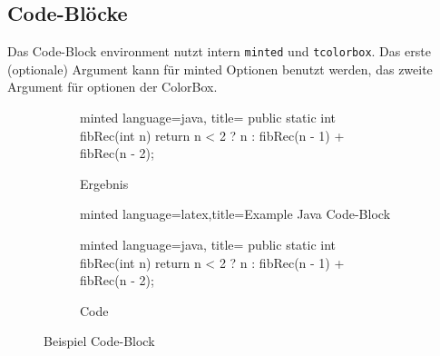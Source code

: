 \documentclass[
    titleprefix=AlgoTeX,
    inlineshortcut=java,
    corporatedesign,
    boxarc,
]{algoexercise}
\begin{document}
    \subsection{Code-Blöcke}
    Das Code-Block environment nutzt intern \verb+minted+ und \verb+tcolorbox+.
    Das erste (optionale) Argument kann für minted Optionen benutzt werden, das zweite Argument für optionen der ColorBox.
    \begin{figure}[ht!]
        \centering
        \begin{subfigure}[t]{\textwidth}
            \centering
            \begin{codeBlock}[]{minted language=java, title=}
                    public static int fibRec(int n) {
                        return n < 2 ? n : fibRec(n - 1) + fibRec(n - 2);
                    }
                \end{codeBlock}
            \caption{Ergebnis}
            \label{fig:code-block-example:result}
        \end{subfigure}
        \begin{subfigure}[t]{\textwidth}
            \centering
            \begin{codeBlock}[]{minted language=latex,title=\faCode\hfill Example Java Code-Block\hfill\faCode}
                    \begin{@codeBlock@}[]{minted language=java, title=}
                        public static int fibRec(int n) {
                            return n < 2 ? n : fibRec(n - 1) + fibRec(n - 2);
                        }
                    \end{@codeBlock@}
                \end{codeBlock}
            \caption{Code}
            \label{fig:code-block-example:code}
        \end{subfigure}
        \label{fig:code-block-example}
        \caption{Beispiel Code-Block}
    \end{figure}
\end{document}
